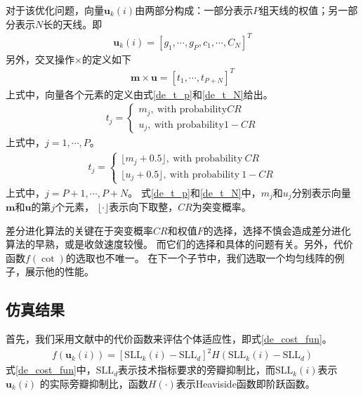 \documentclass[master]{thesis-uestc}
\begin{document}
对于该优化问题，向量$\bm{u}_k(i)$由两部分构成：一部分表示$P$组天线的权值；另一部分表示$N$长的天线。即
\begin{equation}
    \begin{aligned}
        \bm{u}_k(i) = \left[g_1,\cdots,g_P,c_1,\cdots,C_N\right]^T
    \end{aligned}
\end{equation}
另外，交叉操作$\times$的定义如下
\begin{equation}
    \begin{aligned}
        \bm{m} \times \bm{u} = \left[t_1, \cdots, t_{P+N}\right]^T
    \end{aligned}
\end{equation}
上式中，向量各个元素的定义由式\eqref{de_t_p}和\eqref{de_t_N}给出。
\begin{equation}\label{de_t_p}
    \begin{aligned}
        t_j = 
        \begin{cases}
            m_j, ~ \text{with probability} CR \\
            u_j, ~ \text{with probability} 1 - CR
        \end{cases}
    \end{aligned}
\end{equation}
上式中，$j=1,\cdots,P$。
\begin{equation}\label{de_t_N}
    \begin{aligned}
        t_j = 
        \begin{cases}
            \lfloor m_j+0.5 \rfloor, ~ \text{with probability} ~ CR \\
            \lfloor u_j+0.5 \rfloor, ~ \text{with probability} ~ 1 - CR
        \end{cases}
    \end{aligned}
\end{equation}
上式中，$j=P+1,\cdots,P+N$。
式\eqref{de_t_p}和\eqref{de_t_N}中，$m_j$和$u_j$分别表示向量$\bm{m}$和$\bm{u}$的第$j$个元素，
$\lfloor\cdot\rfloor$表示向下取整，$CR$为突变概率。

差分进化算法的关键在于突变概率$CR$和权值$F$的选择，选择不慎会造成差分进化算法的早熟，或是收敛速度较慢。
而它们的选择和具体的问题有关。另外，代价函数$f(\cot)$的选取也不唯一。
在下一个子节中，我们选取一个均匀线阵的例子，展示他的性能。

\subsection{仿真结果}
首先，我们采用文献\cite{Lopez_01}中的代价函数来评估个体适应性，即式\eqref{de_cost_fun}。
\begin{equation}\label{de_cost_fun}
    \begin{aligned}
        f(\bm{u}_k(i)) = \left[\text{SLL}_k(i)-\text{SLL}_d\right]^2 
        H\left(\text{SLL}_k(i)-\text{SLL}_d\right)
    \end{aligned}
\end{equation}
式\eqref{de_cost_fun}中，$\text{SLL}_d$表示技术指标要求的旁瓣抑制比，而$\text{SLL}_k(i)$表示$\bm{u}_k(i)$
的实际旁瓣抑制比，函数$H(\cdot)$表示Heaviside函数即阶跃函数。
\end{document}
